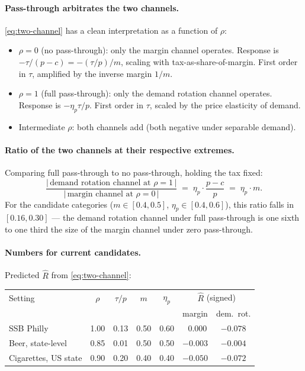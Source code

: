 \documentclass[11pt]{article}
\begin{document}
\paragraph{Pass-through arbitrates the two channels.}
\eqref{eq:two-channel} has a clean interpretation as a
function of $\rho$:
\begin{itemize}
    \item $\rho = 0$ (no pass-through): only the margin
    channel operates. Response is $-\tau/(p-c) =
    -(\tau/p)/m$, scaling with tax-as-share-of-margin.
    First order in $\tau$, amplified by the inverse
    margin $1/m$.

    \item $\rho = 1$ (full pass-through): only the
    demand rotation channel operates. Response is
    $-\eta_p \tau/p$. First order in $\tau$, scaled by
    the price elasticity of demand.

    \item Intermediate $\rho$: both channels add
    (both negative under separable demand).
\end{itemize}

\paragraph{Ratio of the two channels at their
respective extremes.} Comparing full pass-through to no
pass-through, holding the tax fixed:
\[
    \frac{|\,\text{demand rotation channel at } \rho=1\,|}
         {|\,\text{margin channel at } \rho=0\,|}
    \;=\;
    \eta_p \cdot \frac{p-c}{p}
    \;=\;
    \eta_p \cdot m.
\]
For the candidate categories ($m \in [0.4, 0.5]$,
$\eta_p \in [0.4, 0.6]$), this ratio falls in
$[0.16, 0.30]$ --- the demand rotation channel under
full pass-through is one sixth to one third the size of
the margin channel under zero pass-through.

\paragraph{Numbers for current candidates.} Predicted
$\hat R$ from \eqref{eq:two-channel}:

\begin{center}
\begin{tabular}{lcccccc}
\hline
Setting & $\rho$ & $\tau/p$ & $m$ & $\eta_p$ &
\multicolumn{2}{c}{$\hat R$ (signed)} \\
& & & & & margin & dem.\ rot. \\
\hline
SSB Philly                       & 1.00 & 0.13 & 0.50 & 0.60 & $\;\;0.000$ & $-0.078$ \\
Beer, state-level                & 0.85 & 0.01 & 0.50 & 0.50 & $-0.003$ & $-0.004$ \\
Cigarettes, US state             & 0.90 & 0.20 & 0.40 & 0.40 & $-0.050$ & $-0.072$ \\
\hline
\end{tabular}
\end{center}
\end{document}
